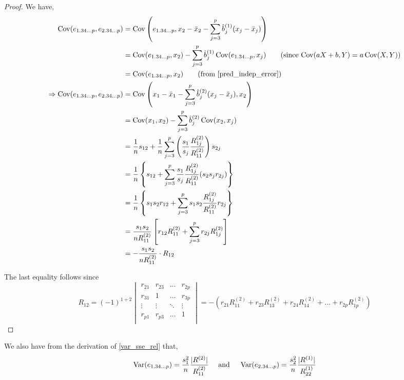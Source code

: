 \documentclass[10pt]{article}
\begin{document}
\begin{proof}
We have, 
\begin{align*}
    \Cov(e_{1.34\dots p}, e_{2.34\dots p}) &= \Cov\left( e_{1.34\dots p}, x_2 - \bar{x}_2 - \sum_{j=3}^{p} \hat{b}_j^{(1)}(x_j - \bar{x}_j) \right) \\
					   &= \Cov(e_{1.34\dots p}, x_2) - \sum_{j=3}^{p} \hat{b}_j^{(1)} \Cov(e_{1.34\dots p}, x_j) \tag*{(since \( \Cov(aX+b, Y) = a\Cov(X, Y) \))} \\
    &= \Cov(e_{1.34\dots p}, x_2) \tag*{(from \eqref{pred_indep_error})} \\
    \implies \Cov(e_{1.34\dots p}, e_{2.34\dots p}) &= \Cov\left( x_1 - \bar{x}_1 - \sum_{j=3}^{p} \hat{b}_j^{(2)}(x_j - \bar{x}_j), x_2 \right) \\
    &= \Cov(x_1, x_2) - \sum_{j=3}^{p} \hat{b}_j^{(2)} \Cov(x_2, x_j) \\
    &= \frac{1}{n} s_{12} + \frac{1}{n} \sum_{j=3}^{p} \left( \frac{s_1}{s_j} \frac{R_{1j}^{(2)}}{R_{11}^{(2)}} \right) s_{2j} \\
    &= \frac{1}{n} \left\{ s_{12} + \sum_{j=3}^{p} \frac{s_1}{s_j} \frac{R_{1j}^{(2)}}{R_{11}^{(2)}} (s_2 s_j r_{2j}) \right\} \\
    &= \frac{1}{n} \left\{ s_1 s_2 r_{12} +  \sum_{j=3}^{p} s_1 s_2 \frac{R_{1j}^{(2)}}{R_{11}^{(2)}} r_{2j} \right\} \\
    &= \frac{s_1 s_2}{n R_{11}^{(2)}} \left[ r_{12} R_{11}^{(2)} + \sum_{j=3}^{p} r_{2j} R_{1j}^{(2)} \right] \\
    &= -\frac{s_1 s_2}{n R_{11}^{(2)}} \cdot R_{12}
\end{align*}

The last equality follows since
\[ R_{12} = (-1)^{1+2} 
\begin{vmatrix}
	r_{21} & r_{23} & \ldots & r_{2p} \\
	r_{31} &   1    & \ldots & r_{3p} \\
	\vdots &  \vdots & \ddots & \vdots \\
	r_{p1} & r_{p3} & \ldots &   1    \\
\end{vmatrix}
= - \left( r_{21}R_{11}^{(2)} + r_{23}R_{13}^{(2)} + r_{24}R_{14}^{(2)} + \dots + r_{2p}R_{1p}^{(2)} \right)
\] 


\end{proof}

We also have from the derivation of \eqref{var_sse_rel} that,
\[ \operatorname{Var}(e_{1.34\dots p}) = \frac{s_1^{2}}{n}\frac{\lvert R^{(2)} \rvert }{R_{11}^{(2)}} \quad \text{ and } \quad \operatorname{Var}(e_{2.34\dots p}) = \frac{s_2^{2}}{n}\frac{\lvert R^{(1)} \rvert }{R_{22}^{(1)}} \] 
\end{document}
